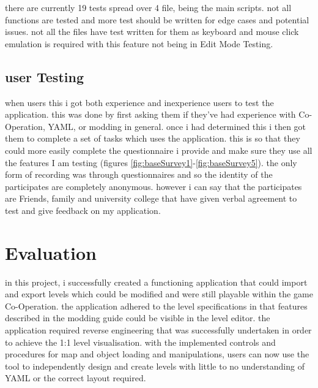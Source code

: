 there are currently 19 tests spread over 4 file, being the main scripts. not all functions are tested and more test should be written for edge cases and potential issues. not all the files have test written for them as keyboard and mouse click emulation is required with this feature not being in Edit Mode Testing.


\subsection{user Testing}
when users this i got both experience and inexperience users to test the application. this was done by first asking them if they've had experience with Co-Operation, YAML, or modding in general. once i had determined this i then got them to complete a set of tasks which uses the application. this is so that they could more easily complete the questionnaire i provide and make sure they use all the features I am testing (figures \ref{fig:baseSurvey1}-\ref{fig:baseSurvey5}). the only form of recording was through questionnaires and so the identity of the participates are completely anonymous. however i can say that the participates are Friends, family and university college that have given verbal agreement to test and give feedback on my application.




\section{Evaluation}

in this project, i successfully created a functioning application that could import and export levels which could be modified and were still playable within the game Co-Operation. the application adhered to the level specifications in that features described in the modding guide could be visible in the level editor. the application required reverse engineering that was successfully undertaken in order to achieve the 1:1 level visualisation. with the implemented controls and procedures for map and object loading and manipulations, users can now use the tool to independently design and create levels with little to no understanding of YAML or the correct layout required. 

